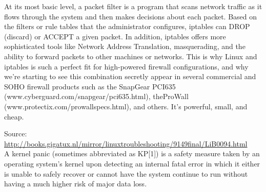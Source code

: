 \documentclass{article}
\begin{document}
\begin{itemize}
At its most basic level, a packet filter is a program that scans network traffic as it flows through the system and then makes decisions about each packet. Based on the filters or rule tables that the administrator configures, iptables can DROP (discard) or ACCEPT a given packet. In addition, iptables offers more sophisticated tools like Network Address Translation, masquerading, and the ability to forward packets to other machines or networks. This is why Linux and iptables is such a perfect fit for high-powered firewall configurations, and why we're starting to see this combination secretly appear in several commercial and SOHO firewall products such as the SnapGear PCI635 (www.cyberguard.com/snapgear/pci635.html), theProWall (www.protectix.com/prowallspecs.html), and others. It's powerful, small, and cheap.

Source: \url{http://books.gigatux.nl/mirror/linuxtroubleshooting/9149final/LiB0094.html}\\

{ A kernel panic (sometimes abbreviated as KP[1]) is a safety measure taken by an operating system's kernel upon detecting an internal fatal error in which it either is unable to safely recover or cannot have the system continue to run without having a much higher risk of major data loss. }\\




\end{itemize}
\end{document}
